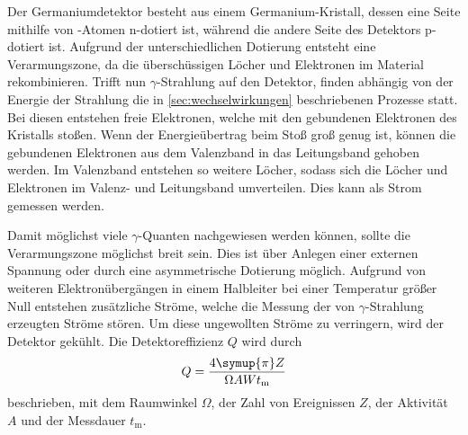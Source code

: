 Der Germaniumdetektor besteht aus einem Germanium-Kristall,
dessen eine Seite mithilfe von -Atomen n-dotiert ist,
während die andere Seite des Detektors p-dotiert ist. %
Aufgrund der unterschiedlichen Dotierung entsteht eine Verarmungszone,
da die überschüssigen Löcher und Elektronen im Material rekombinieren.
Trifft nun $\gamma$-Strahlung auf den Detektor,
finden abhängig von der Energie der Strahlung die in \autoref{sec:wechselwirkungen} beschriebenen Prozesse statt.
Bei diesen entstehen freie Elektronen,
welche mit den gebundenen Elektronen des Kristalls stoßen.
Wenn der Energieübertrag beim Stoß groß genug ist,
können die gebundenen Elektronen aus dem Valenzband in das Leitungsband gehoben werden.
Im Valenzband entstehen so weitere Löcher,
sodass sich die Löcher und Elektronen im Valenz- und Leitungsband umverteilen.
Dies kann als Strom gemessen werden.

Damit möglichst viele $\gamma$-Quanten nachgewiesen werden können,
sollte die Verarmungszone möglichst breit sein.
Dies ist über Anlegen einer externen Spannung
oder durch eine asymmetrische Dotierung möglich.
Aufgrund von weiteren Elektronübergängen in einem Halbleiter bei einer Temperatur größer Null entstehen zusätzliche Ströme,
welche die Messung der von $\gamma$-Strahlung erzeugten Ströme stören.
Um diese ungewollten Ströme zu verringern,
wird der Detektor gekühlt.
Die Detektoreffizienz $Q$ wird durch
\begin{equation}
    Q = \frac{4 \symup{\pi} Z}{\Omega A W t_\text{m}}
    \label{eqn:effizienz}
\end{equation}
beschrieben,
mit dem Raumwinkel $\Omega$,
der Zahl von Ereignissen $Z$,
der Aktivität $A$ und der Messdauer $t_\text{m}$.
